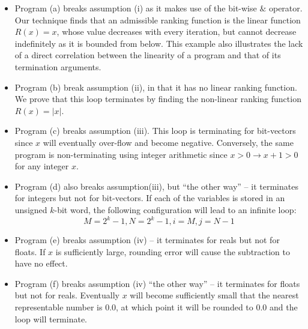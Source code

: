 \documentclass[preprint]{sigplanconf}
\theoremstyle{definition}
\begin{document}
\begin{itemize}

\item Program (a) breaks assumption (i) as it makes use of the bit-wise $\&$ operator.
Our technique finds that an admissible ranking function is the linear function
$R(x) = x$, whose value decreases with
every iteration, but cannot decrease indefinitely as it is bounded from below.
This example also illustrates the lack of a direct correlation between the linearity of a program and that of its termination arguments.

\item Program (b) break assumption (ii), in that it has no linear ranking function.
We prove that this loop terminates by finding the non-linear ranking function $R(x) = |x|$.

\item Program (c) breaks assumption (iii).
This loop is  terminating for bit-vectors since $x$
will eventually over-flow and become negative. Conversely, the same program is non-terminating using integer
arithmetic since $x > 0 \rightarrow x+1 > 0$ for any integer $x$.

\item Program (d) also breaks assumption(iii), but ``the other way'' -- it terminates for integers but not for bit-vectors.
If each of the variables is stored in an unsigned $k$-bit word, the following configuration will
lead to an infinite loop:
$$M = 2^k - 1, N = 2^k - 1, i = M, j = N-1$$

\item Program (e) breaks assumption (iv) -- it terminates for reals but not for floats.
If $x$ is sufficiently large, rounding error will cause the subtraction to have no effect.

\item Program (f) breaks assumption (iv) ``the other way'' -- it terminates for floats but not for reals.
Eventually $x$ will become sufficiently small that the nearest representable number is 0.0, at which point
it will be rounded to 0.0 and the loop will terminate.
\end{itemize}
\end{document}

